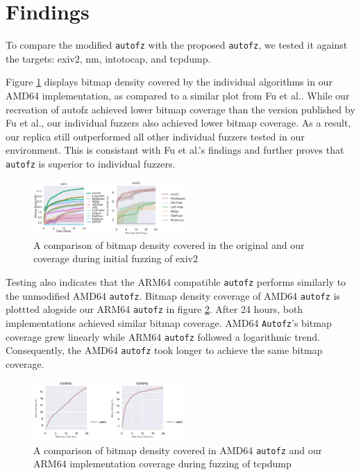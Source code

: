 \section{Findings}

To compare the modified \texttt{autofz} with the proposed \texttt{autofz}, we tested it against the 
targets: exiv2, nm, intotocap, and tcpdump. 

Figure \ref{fig:exiv2_compare_orig_arm64} displays bitmap density covered by the individual algorithms in our AMD64 implementation, 
as compared to a similar plot from Fu et al.\cite{fu_autofz_2023}. While our recreation of autofz achieved lower bitmap coverage than 
the version published by Fu et al., our individual fuzzers also achieved lower bitmap coverage. As a result, our replica still 
outperformed all other individual fuzzers tested in our environment. This is consistant
with Fu et al.'s findings and further proves that \texttt{autofz} is superior to individual fuzzers.

\begin{figure}
    \includegraphics[width=0.52\textwidth]{figs/exiv2_compare_orig_arm64.png}
    \centering
    \caption{A comparison of bitmap density covered in the original\cite{fu_autofz_2023} and our 
    coverage during initial fuzzing of exiv2}
    \label{fig:exiv2_compare_orig_arm64}
\end{figure}

Testing also indicates that the ARM64 compatible \texttt{autofz} performs similarly to the unmodified AMD64 \texttt{autofz}. 
Bitmap density coverage of AMD64 \texttt{autofz} is plottted alogside our ARM64 \texttt{autofz} in figure 
\ref{fig:tcpdump_compare_orig_arm64}. After 24 hours, both implementations achieved similar bitmap coverage.
AMD64 \texttt{Autofz}'s bitmap coverage grew linearly while ARM64 \texttt{autofz} followed a logarithmic trend. Consequently, 
the AMD64 \texttt{autofz} took longer to achieve the same bitmap coverage. 

\begin{figure}
    \includegraphics[width=0.52\textwidth]{figs/tcpdump_compare_orig_arm64.png}
    \centering
    \caption{A comparison of bitmap density covered in AMD64 \texttt{autofz} and our ARM64 implementation
    coverage during fuzzing of tcpdump}
    \label{fig:tcpdump_compare_orig_arm64}
\end{figure}

